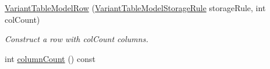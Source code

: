 \begin{DoxyCompactItemize}
\item 
\hyperlink{class_mdt_1_1_item_model_1_1_variant_table_model_row_abcca67f088c0267b2ef234d0fdf27e32}{Variant\+Table\+Model\+Row} (\hyperlink{namespace_mdt_1_1_item_model_ad48e47e80d7e13b5b951346649748190}{Variant\+Table\+Model\+Storage\+Rule} storage\+Rule, int col\+Count)\hypertarget{class_mdt_1_1_item_model_1_1_variant_table_model_row_abcca67f088c0267b2ef234d0fdf27e32}{}\label{class_mdt_1_1_item_model_1_1_variant_table_model_row_abcca67f088c0267b2ef234d0fdf27e32}

\begin{DoxyCompactList}\small\item\em Construct a row with col\+Count columns. \end{DoxyCompactList}\item 
int \hyperlink{class_mdt_1_1_item_model_1_1_variant_table_model_row_a244df69ed410f0dc7f1fdd48d1b55931}{column\+Count} () const \hypertarget{class_mdt_1_1_item_model_1_1_variant_table_model_row_a244df69ed410f0dc7f1fdd48d1b55931}{}\label{class_mdt_1_1_item_model_1_1_variant_table_model_row_a244df69ed410f0dc7f1fdd48d1b55931}


\end{DoxyCompactItemize}
